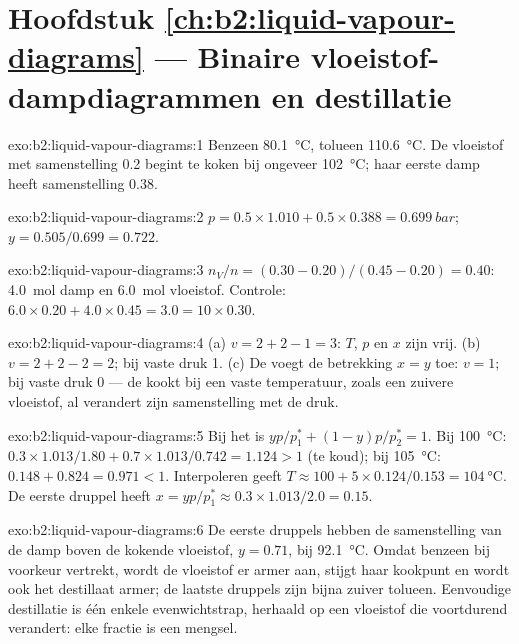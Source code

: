 \section*{Hoofdstuk \ref{ch:b2:liquid-vapour-diagrams} --- Binaire vloeistof-dampdiagrammen en destillatie}

\begin{solution}{exo:b2:liquid-vapour-diagrams:1}
Benzeen \qty{80.1}{\degreeCelsius}, tolueen \qty{110.6}{\degreeCelsius}. De vloeistof
met samenstelling 0.2 begint te koken bij ongeveer \qty{102}{\degreeCelsius}; haar eerste
damp heeft samenstelling 0.38.
\end{solution}

\begin{solution}{exo:b2:liquid-vapour-diagrams:2}
$p = 0.5 \times 1.010 + 0.5 \times 0.388 = \qty{0.699}{bar}$;
$y = 0.505/0.699 = 0.722$.
\end{solution}

\begin{solution}{exo:b2:liquid-vapour-diagrams:3}
$n_V/n = (0.30 - 0.20)/(0.45 - 0.20) = 0.40$: \qty{4.0}{mol} damp en
\qty{6.0}{mol} vloeistof. Controle: $6.0 \times 0.20 + 4.0 \times 0.45 = 3.0 = 10
\times 0.30$.
\end{solution}

\begin{solution}{exo:b2:liquid-vapour-diagrams:4}
(a) $v = 2 + 2 - 1 = 3$: $T$, $p$ en $x$ zijn vrij. (b) $v = 2 + 2 - 2 = 2$; bij
vaste druk 1. (c) De  voegt de betrekking $x = y$ toe: $v = 1$; bij vaste
druk 0 --- de  kookt bij een vaste temperatuur, zoals een zuivere vloeistof,
al verandert zijn samenstelling met de druk.
\end{solution}

\begin{solution}{exo:b2:liquid-vapour-diagrams:5}
Bij het  is $yp/p_1^* + (1 - y)p/p_2^* = 1$. Bij \qty{100}{\degreeCelsius}:
$0.3 \times 1.013/1.80 + 0.7 \times 1.013/0.742 = 1.124 > 1$ (te koud); bij
\qty{105}{\degreeCelsius}: $0.148 + 0.824 = 0.971 < 1$. Interpoleren geeft $T \approx
100 + 5 \times 0.124/0.153 = \qty{104}{\degreeCelsius}$. De eerste druppel heeft $x =
yp/p_1^* \approx 0.3 \times 1.013/2.0 = 0.15$.
\end{solution}

\begin{solution}{exo:b2:liquid-vapour-diagrams:6}
De eerste druppels hebben de samenstelling van de damp boven de kokende vloeistof,
$y = 0.71$, bij \qty{92.1}{\degreeCelsius}. Omdat benzeen bij voorkeur vertrekt, wordt de
vloeistof er armer aan, stijgt haar kookpunt en wordt ook het destillaat
armer; de laatste druppels zijn bijna zuiver tolueen. Eenvoudige destillatie is één
enkele evenwichtstrap, herhaald op een vloeistof die voortdurend verandert: elke
fractie is een mengsel.
\end{solution}

